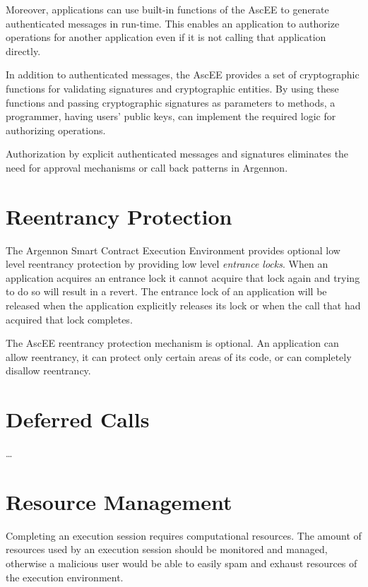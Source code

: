 Moreover, applications can use built-in functions of the AscEE to generate authenticated messages in run-time.
This enables an application to authorize operations for another application even if it is not calling that
application directly.

In addition to authenticated messages, the AscEE provides a set of
cryptographic functions for validating signatures and cryptographic entities. By using these functions and
passing cryptographic signatures as parameters to methods, a programmer, having users' public keys, can implement
the required logic for authorizing operations.

Authorization by explicit authenticated messages and signatures eliminates the need for approval mechanisms or call back
patterns in Argennon.



\section{Reentrancy Protection}\label{sec:reentrancy}

The Argennon Smart Contract Execution Environment provides optional low level reentrancy protection by providing low
level \emph{entrance locks}. When an application acquires an entrance lock it cannot acquire that lock again and trying
to do so will result in a revert. The entrance lock of an application will be released when the application explicitly
releases its lock or when the call that had acquired that lock completes.

The AscEE reentrancy protection mechanism is optional. An application can allow reentrancy, it can protect only certain
areas of its code, or can completely disallow reentrancy.


\section{Deferred Calls}\label{sec:deferred-calls}

\ldots


\section{Resource Management}\label{sec:res-man}

Completing an execution session requires computational resources. The amount of resources used by an execution session
should be monitored and managed, otherwise a malicious user would be able to easily spam and exhaust resources of the
execution environment.

